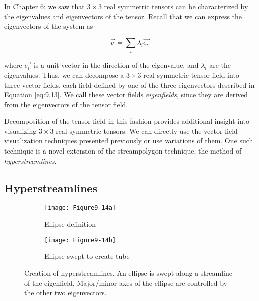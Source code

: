 In Chapter 6:  we saw that $3 \times 3$ real symmetric tensors can be characterized by the eigenvalues and eigenvectors of the tensor. Recall that we can express the eigenvectors of the system as

\begin{equation}\label{eq:9.13}
\overrightarrow{v\ } = \sum_i \lambda_i \overrightarrow{e_i\ }
\end{equation}

\noindent where $\overrightarrow{e_i\ }$ is a unit vector in the direction of the eigenvalue, and $\lambda_i$ are the eigenvalues. Thus, we can decompose a  $3 \times 3$ real symmetric tensor field into three vector fields, each field defined by one of the three eigenvectors described in Equation \ref{eq:9.13}. We call these vector fields \emph{eigenfields}, since they are derived from the eigenvectors of the tensor field.

Decomposition of the tensor field in this fashion provides additional insight into visualizing $3 \times 3$ real symmetric tensors. We can directly use the vector field visualization techniques presented previously or use variations of them. One such technique is a novel extension of the streampolygon technique, the method of \emph{hyperstreamlines}.

\subsection{Hyperstreamlines}

\begin{figure}[htb]
	\begin{subfigure}[h]{0.48\linewidth}
		\texttt{[image: Figure9-14a]}
		\captionsetup{justification=centering}
		\caption{Ellipse definition}
		\label{fig:Figure9-14a}
	\end{subfigure}
	\hfill
	\begin{subfigure}[h]{0.48\linewidth}
		\texttt{[image: Figure9-14b]}
		\captionsetup{justification=centering}
		\caption{Ellipse swept to create tube}
		\label{fig:Figure9-14b}
	\end{subfigure}
	\caption{Creation of hyperstreamlines. An ellipse is swept along a streamline of the eigenfield. Major/minor axes of the ellipse are controlled by the other two eigenvectors.}\label{fig:Figure9-14}
\end{figure}

